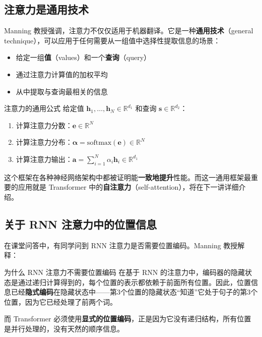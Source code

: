 \documentclass[a4paper]{article}
\begin{document}
\subsection{注意力是通用技术}

Manning 教授强调，注意力不仅仅适用于机器翻译。它是一种\textbf{通用技术}（general technique），可以应用于任何需要从一组值中选择性提取信息的场景：

\begin{itemize}
    \item 给定一组\textbf{值}（values）和一个\textbf{查询}（query）
    \item 通过注意力计算值的加权平均
    \item 从中提取与查询最相关的信息
\end{itemize}

\begin{importantbox}{注意力的通用公式}
给定值 $\mathbf{h}_1, \ldots, \mathbf{h}_N \in \mathbb{R}^{d_1}$ 和查询 $\mathbf{s} \in \mathbb{R}^{d_2}$：
\begin{enumerate}
    \item 计算注意力分数：$\mathbf{e} \in \mathbb{R}^N$
    \item 计算注意力分布：$\boldsymbol{\alpha} = \mathrm{softmax}(\mathbf{e}) \in \mathbb{R}^N$
    \item 计算注意力输出：$\mathbf{a} = \sum_{i=1}^N \alpha_i \mathbf{h}_i \in \mathbb{R}^{d_1}$
\end{enumerate}
这个框架在各种神经网络架构中都被证明能\textbf{一致地提升}性能。而这一通用框架最重要的应用就是 Transformer 中的\textbf{自注意力}（self-attention），将在下一讲详细介绍。
\end{importantbox}

\subsection{关于 RNN 注意力中的位置信息}

在课堂问答中，有同学问到 RNN 注意力是否需要位置编码。Manning 教授解释：

\begin{knowledgebox}{为什么 RNN 注意力不需要位置编码}
在基于 RNN 的注意力中，编码器的隐藏状态是通过递归计算得到的，每个位置的表示都依赖于前面所有位置。因此，位置信息已经\textbf{隐式编码}在隐藏状态中——第3个位置的隐藏状态``知道''它处于句子的第3个位置，因为它已经处理了前两个词。

而 Transformer 必须使用\textbf{显式的位置编码}，正是因为它没有递归结构，所有位置是并行处理的，没有天然的顺序信息。
\end{knowledgebox}
\end{document}
